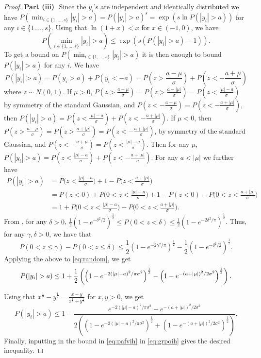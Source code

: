 \documentclass[bj,authoryear]{imsart}
\theoremstyle{plain}
\begin{document}
\begin{proof}
\textbf{Part (iii)}\,\, 
Since the $y_i$'s are independent and identically distributed we have $P(\min_{i\in\{1,\ldots,s\}}|y_i|>a)=P(|y_i|>a)^s= \exp\left(s\ln{P(|y_i|>a)}\right)$ for any $i\in\{1.\ldots,s\}$. Using that $\ln\left(1+ x \right)< x$ for $x\in(-1,0)$, we have
\begin{equation}\label{eq:grpoih}
    P(\min_{i\in\{1,\ldots,s\}}|y_i|>a)\leq \exp\left(s(P(|y_i|>a)-1)\right).
\end{equation}
To get a bound on $P(\min_{i\in\{1,\ldots,s\}}|y_i|>a)$ it is then enough to bound $P(|y_i|>a)$ for any $i$. We have
$$P(|y_i|>a) = P(y_i>a) + P(y_i<-a) = P(z>\frac{a-\mu}{\sigma}) + P(z<-\frac{a+\mu}{\sigma})$$
where $z\sim N(0,1)$. If $\mu>0$, $P(z>\frac{a-\mu}{\sigma})  =  P(z>\frac{a-|\mu|}{\sigma})= P(z<\frac{|\mu|-a}{\sigma})$ by symmetry of the standard Gaussian, and $P(z<-\frac{a+\mu}{\sigma})=P(z<-\frac{a+|\mu|}{\sigma})$, then $P(|y_i|>a) =  P(z<\frac{|\mu|-a}{\sigma}) + P(z<-\frac{a+|\mu|}{\sigma})$.
If $\mu<0$, then $P(z>\frac{a-\mu}{\sigma})=P(z>\frac{a+|\mu|}{\sigma})=P(z<-\frac{a+|\mu|}{\sigma})$, by symmetry of the standard Gaussian, and $P(z<-\frac{a+\mu}{\sigma})=P(z<\frac{|\mu|-a}{\sigma})$. Then for any $\mu$, $P(|y_i|>a)  = P(z<\frac{|\mu|-a}{\sigma}) + P(z<-\frac{a+|\mu|}{\sigma}) $. For any $a<|\mu|$ we further have
\begin{align}
    P(|y_i|>a) &= P\Big(z<\frac{|\mu|-a}{\sigma}\Big) + 1- P\Big(z<\frac{a+|\mu|}{\sigma}\Big) \nonumber \\
    &= P(z<0)
    +P\Big(0<z<\frac{|\mu|-a}{\sigma}\Big)+ 1 - P(z<0) - P\Big(0<z<\frac{a+|\mu|}{\sigma}\Big) \nonumber \\
    &= 1+P\Big(0<z<\frac{|\mu|-a}{\sigma}\Big)-P\Big(0<z<\frac{a+|\mu|}{\sigma}\Big)\label{eq:random}.
\end{align}
From \cite{chu}, for any $\delta>0$, $\frac{1}{2}\left(1-e^{-\delta^2/2}\right)^{\frac{1}{2}}\leq P(0 <z < \delta)\leq \frac{1}{2}\left(1-e^{-2\delta^2/\pi}\right)^{\frac{1}{2}}$. Thus, for any $\gamma,\delta>0$, we have that
$$ P(0<z \leq \gamma)-P(0<z \leq \delta)\leq
\frac{1}{2}\left(1-e^{-2\gamma^2/\pi}\right)^{\frac{1}{2}}-\frac{1}{2}\left(1-e^{-\delta^2/2}\right)^{\frac{1}{2}}.$$
Applying the above to \eqref{eq:random}, we get
$$P(|y_i|>a) \leq 
1+ \frac{1}{2}\left(\left(1-e^{-2(|\mu|-a)^2/\pi\sigma^2}\right)^{\frac{1}{2}}-\left(1-e^{-(a+|\mu|)^2/2\sigma^2}\right)^{\frac{1}{2}}\right).\\$$

Using that $x^{\frac{1}{2}}-y^{\frac{1}{2}}=\frac{x-y}{x^{\frac{1}{2}}+y^{\frac{1}{2}}}$ for $x,y>0$, we get
 \begin{equation}\label{eq:pafvih}
    P(|y_i|>a) \leq 1- \frac{e^{-2(|\mu|-a)^2/\pi\sigma^2}-e^{-(a+|\mu|)^2/2\sigma^2}}{2\left(\left(1-e^{-2(|\mu|-a)^2/\pi\sigma^2}\right)^{\frac{1}{2}}+\left(1-e^{-(a+|\mu|)^2/2\sigma^2}\right)^{\frac{1}{2}}\right)}. 
 \end{equation}
Finally, inputting in the bound in \eqref{eq:pafvih} in \eqref{eq:grpoih} gives the desired inequality.
\end{proof}
\end{document}
